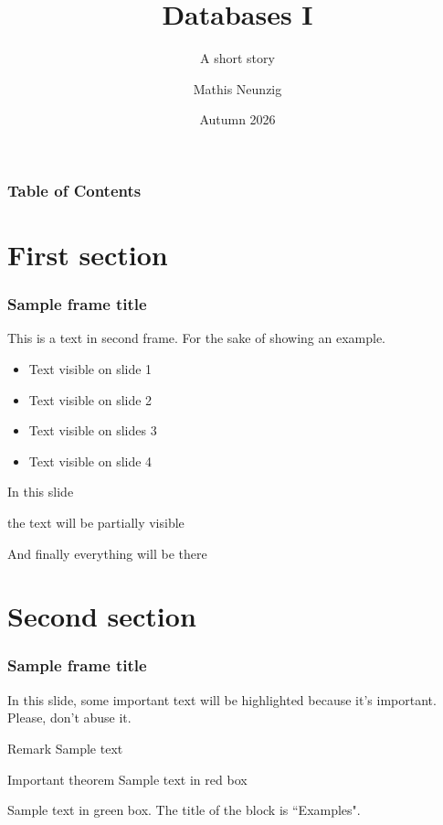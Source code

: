 \documentclass{beamer}
\title[About Beamer] %
{Databases I}
\subtitle{A short story}
\author[Neunzig, Mathis] %
{Mathis Neunzig}
\institute[DHBW] %
{DHBW Mosbach}
\date[] %
{Autumn 2026}
\begin{document}
\frame{\titlepage}


\begin{frame}
\frametitle{Table of Contents}
\tableofcontents
\end{frame}


\section{First section}

\begin{frame}
\frametitle{Sample frame title}
This is a text in second frame. For the sake of showing an example.

\begin{itemize}
    \item<1-> Text visible on slide 1
    \item<2-> Text visible on slide 2
    \item<3> Text visible on slides 3
    \item<4-> Text visible on slide 4
\end{itemize}
\end{frame}



\begin{frame}
In this slide \pause

the text will be partially visible \pause

And finally everything will be there
\end{frame}

\section{Second section}

\begin{frame}
\frametitle{Sample frame title}

In this slide, some important text will be
\alert{highlighted} because it's important.
Please, don't abuse it.

\begin{block}{Remark}
Sample text
\end{block}

\begin{alertblock}{Important theorem}
Sample text in red box
\end{alertblock}

\begin{examples}
Sample text in green box. The title of the block is ``Examples".
\end{examples}
\end{frame}
\end{document}

